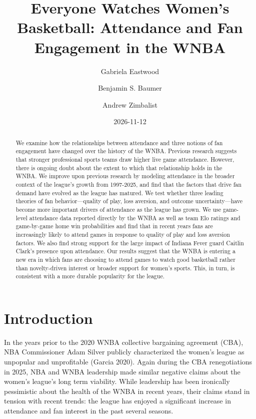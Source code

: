 \documentclass[
  letterpaper,
  DIV=11,
  numbers=noendperiod]{scrartcl}
\title{Everyone Watches Women's Basketball: Attendance and Fan
Engagement in the WNBA}
\author{Gabriela Eastwood \and Benjamin S. Baumer \and Andrew Zimbalist}
\date{2026-11-12}
\begin{document}
\maketitle
\begin{abstract}
We examine how the relationships between attendance and three notions of
fan engagement have changed over the history of the WNBA. Previous
research suggests that stronger professional sports teams draw higher
live game attendance. However, there is ongoing doubt about the extent
to which that relationship holds in the WNBA. We improve upon previous
research by modeling attendance in the broader context of the league's
growth from 1997-2025, and find that the factors that drive fan demand
have evolved as the league has matured. We test whether three leading
theories of fan behavior---quality of play, loss aversion, and outcome
uncertainty---have become more important drivers of attendance as the
league has grown. We use game-level attendance data reported directly by
the WNBA as well as team Elo ratings and game-by-game home win
probabilities and find that in recent years fans are increasingly likely
to attend games in response to quality of play and loss aversion
factors. We also find strong support for the large impact of Indiana
Fever guard Caitlin Clark's presence upon attendance. Our results
suggest that the WNBA is entering a new era in which fans are choosing
to attend games to watch good basketball rather than novelty-driven
interest or broader support for women's sports. This, in turn, is
consistent with a more durable popularity for the league.
\end{abstract}


\section{Introduction}\label{sec-intro}

In the years prior to the 2020 WNBA collective bargaining agreement
(CBA), NBA Commissioner Adam Silver publicly characterized the women's
league as unpopular and unprofitable (Garcia 2020). Again during the CBA
renegotiations in 2025, NBA and WNBA leadership made similar negative
claims about the women's league's long term viability. While leadership
has been ironically pessimistic about the health of the WNBA in recent
years, their claims stand in tension with recent trends: the league has
enjoyed a significant increase in attendance and fan interest in the
past several seasons.
\end{document}

